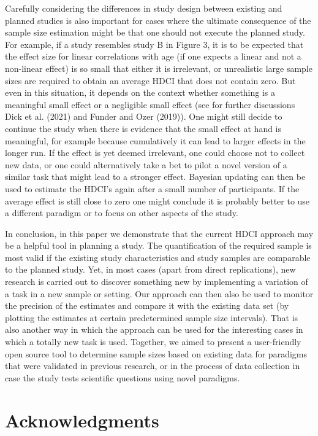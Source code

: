 \documentclass[
  letterpaper,
  DIV=11,
  numbers=noendperiod]{scrartcl}
\begin{document}
Carefully considering the differences in study design between existing
and planned studies is also important for cases where the ultimate
consequence of the sample size estimation might be that one should not
execute the planned study. For example, if a study resembles study B in
Figure 3, it is to be expected that the effect size for linear
correlations with age (if one expects a linear and not a non-linear
effect) is so small that either it is irrelevant, or unrealistic large
sample sizes are required to obtain an average HDCI that does not
contain zero. But even in this situation, it depends on the context
whether something is a meaningful small effect or a negligible small
effect (see for further discussions Dick et al. (2021) and Funder and
Ozer (2019)). One might still decide to continue the study when there is
evidence that the small effect at hand is meaningful, for example
because cumulatively it can lead to larger effects in the longer run. If
the effect is yet deemed irrelevant, one could choose not to collect new
data, or one could alternatively take a bet to pilot a novel version of
a similar task that might lead to a stronger effect. Bayesian updating
can then be used to estimate the HDCI's again after a small number of
participants. If the average effect is still close to zero one might
conclude it is probably better to use a different paradigm or to focus
on other aspects of the study.

In conclusion, in this paper we demonstrate that the current HDCI
approach may be a helpful tool in planning a study. The quantification
of the required sample is most valid if the existing study
characteristics and study samples are comparable to the planned study.
Yet, in most cases (apart from direct replications), new research is
carried out to discover something new by implementing a variation of a
task in a new sample or setting. Our approach can then also be used to
monitor the precision of the estimates and compare it with the existing
data set (by plotting the estimates at certain predetermined sample size
intervals). That is also another way in which the approach can be used
for the interesting cases in which a totally new task is used. Together,
we aimed to present a user-friendly open source tool to determine sample
sizes based on existing data for paradigms that were validated in
previous research, or in the process of data collection in case the
study tests scientific questions using novel paradigms.

\section{Acknowledgments}\label{acknowledgments}
\end{document}
